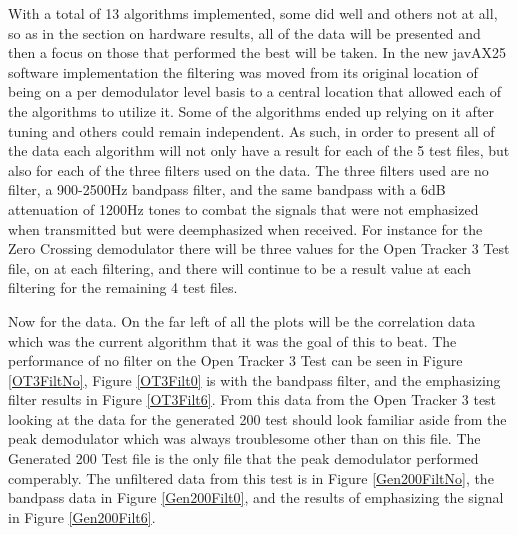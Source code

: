 With a total of 13 algorithms implemented, some did well and others not at all, so as in the section on hardware results, all of the data will be presented and then a focus on those that performed the best will be taken. In the new javAX25 software implementation the filtering was moved from its original location of being on a per demodulator level basis to a central location that allowed each of the algorithms to utilize it. Some of the algorithms ended up relying on it after tuning and others could remain independent. As such, in order to present all of the data each algorithm will not only have a result for each of the 5 test files, but also for each of the three filters used on the data. The three filters used are no filter, a 900-2500Hz bandpass filter, and the same bandpass with a 6dB attenuation of 1200Hz tones to combat the signals that were not emphasized when transmitted but were deemphasized when received. For instance for the Zero Crossing demodulator there will be three values for the Open Tracker 3 Test file, on at each filtering, and there will continue to be a result value at each filtering for the remaining 4 test files.

Now for the data. On the far left of all the plots will be the correlation data which was the current algorithm that it was the goal of this to beat. The performance of no filter on the Open Tracker 3 Test can be seen in Figure \ref{OT3FiltNo}, Figure \ref{OT3Filt0} is with the bandpass filter, and the emphasizing filter results in Figure \ref{OT3Filt6}. From this data from the Open Tracker 3 test looking at the data for the generated 200 test should look familiar aside from the peak demodulator which was always troublesome other than on this file. The Generated 200 Test file is the only file that the peak demodulator performed comperably. The unfiltered data from this test is in Figure \ref{Gen200FiltNo}, the bandpass data in Figure \ref{Gen200Filt0}, and the results of emphasizing the signal in Figure \ref{Gen200Filt6}.

